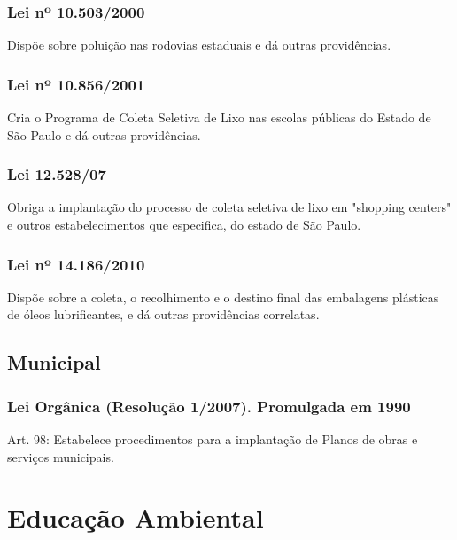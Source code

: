 \begin{subapend}
\begin{subsubapend}
		\subsubsection{Lei nº 10.503/2000}
		Dispõe sobre poluição nas rodovias estaduais e dá outras providências.
		\subsubsection{Lei nº 10.856/2001}
		Cria o Programa de Coleta Seletiva de Lixo nas escolas públicas do Estado de São Paulo e dá outras providências.
		\subsubsection{Lei 12.528/07}
		Obriga a implantação do processo de coleta seletiva de lixo em "shopping centers" e outros estabelecimentos que especifica, do estado de São Paulo.
		\subsubsection{Lei nº 14.186/2010}
		Dispõe sobre a coleta, o recolhimento e o destino final das embalagens plásticas de óleos lubrificantes, e dá outras providências correlatas.
	\end{subsubapend}
\end{subapend}

\begin{subapend}
	\subsection{Municipal}
	\begin{subsubapend}
		\item \subsubsection{Lei Orgânica (Resolução 1/2007). Promulgada em 1990}                               
		Art. 98: Estabelece procedimentos para a implantação de Planos de obras e serviços municipais.
	\end{subsubapend}
\end{subapend}


                                
\section{Educação Ambiental}

